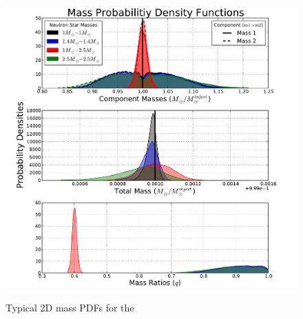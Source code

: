 \documentclass{emulateapj}
\begin{document}
\begin{figure}[h!]
  \centering
 \includegraphics[trim=2cm 0cm 2cm 0cm, clip=true,scale=0.67]{newMasses.pdf}
 \label{masses}
 \caption{Typical 2D mass PDFs for the }
\end{figure}

\end{document}
